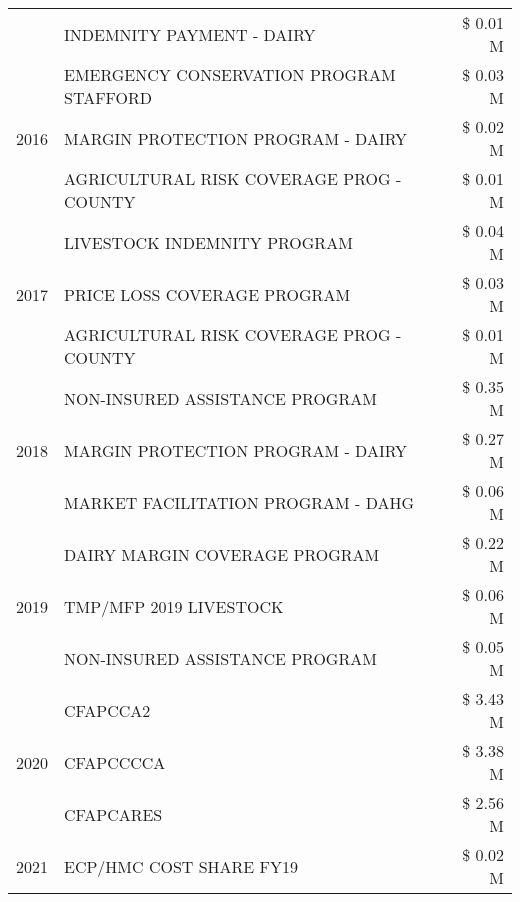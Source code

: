 \begin{tabular}{llr}
 & INDEMNITY PAYMENT - DAIRY & \$ 0.01 M \\
\cline{1-3}
\multirow[t]{3}{*}{2016} & EMERGENCY CONSERVATION PROGRAM STAFFORD & \$ 0.03 M \\
 & MARGIN PROTECTION PROGRAM - DAIRY & \$ 0.02 M \\
 & AGRICULTURAL RISK COVERAGE PROG - COUNTY & \$ 0.01 M \\
\cline{1-3}
\multirow[t]{3}{*}{2017} & LIVESTOCK INDEMNITY PROGRAM & \$ 0.04 M \\
 & PRICE LOSS COVERAGE PROGRAM & \$ 0.03 M \\
 & AGRICULTURAL RISK COVERAGE PROG - COUNTY & \$ 0.01 M \\
\cline{1-3}
\multirow[t]{3}{*}{2018} & NON-INSURED ASSISTANCE PROGRAM & \$ 0.35 M \\
 & MARGIN PROTECTION PROGRAM - DAIRY & \$ 0.27 M \\
 & MARKET FACILITATION PROGRAM - DAHG & \$ 0.06 M \\
\cline{1-3}
\multirow[t]{3}{*}{2019} & DAIRY MARGIN COVERAGE PROGRAM & \$ 0.22 M \\
 & TMP/MFP 2019 LIVESTOCK & \$ 0.06 M \\
 & NON-INSURED ASSISTANCE PROGRAM & \$ 0.05 M \\
\cline{1-3}
\multirow[t]{3}{*}{2020} & CFAPCCA2 & \$ 3.43 M \\
 & CFAPCCCCA & \$ 3.38 M \\
 & CFAPCARES & \$ 2.56 M \\
\cline{1-3}
2021 & ECP/HMC COST SHARE FY19 & \$ 0.02 M \\
\cline{1-3}
\bottomrule
\end{tabular}
